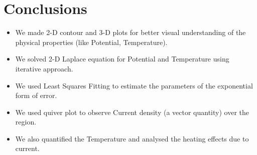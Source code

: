 \documentclass[11pt, a4paper]{article}
\begin{document}
\section{Conclusions}
\begin{itemize}
\item We made 2-D contour and 3-D plots for better visual understanding of the physical properties (like Potential, Temperature).
\item We solved 2-D Laplace equation for Potential and Temperature using iterative approach.
\item We used Least Squares Fitting to estimate the parameters of the exponential form of error.
\item We used quiver plot to observe Current density (a vector quantity) over the region.
\item We also quantified the Temperature and analysed the heating effects due to current.
\end{itemize}
\end{document}
